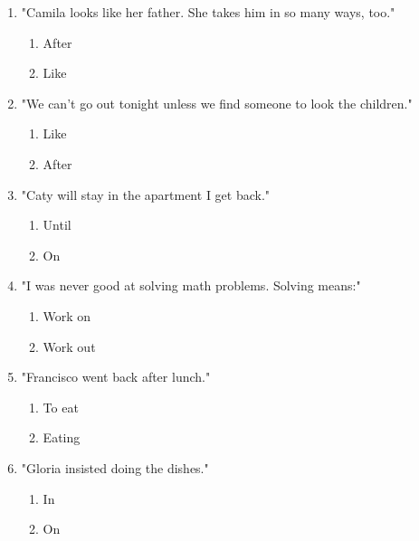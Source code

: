\documentclass[11pt,a4paper]{article}
\begin{document}
\begin{enumerate}
    \item "Camila looks like her father. She takes \underline{\hspace{2cm}} him in so many ways, too."
    \begin{enumerate}[label=\alph*.] \item After \item Like \end{enumerate}

    \item "We can't go out tonight unless we find someone to look \underline{\hspace{2cm}} the children."
    \begin{enumerate}[label=\alph*.] \item Like \item After \end{enumerate}

    \item "Caty will stay in the apartment \underline{\hspace{2cm}} I get back."
    \begin{enumerate}[label=\alph*.] \item Until \item On \end{enumerate}

    \item "I was never good at solving math problems. Solving means:"
    \begin{enumerate}[label=\alph*.] \item Work on \item Work out \end{enumerate}

    \item "Francisco went back after \underline{\hspace{2cm}} lunch."
    \begin{enumerate}[label=\alph*.] \item To eat \item Eating \end{enumerate}

    \item "Gloria insisted \underline{\hspace{2cm}} doing the dishes."
    \begin{enumerate}[label=\alph*.] \item In \item On \end{enumerate}


\end{enumerate}
\end{document}
